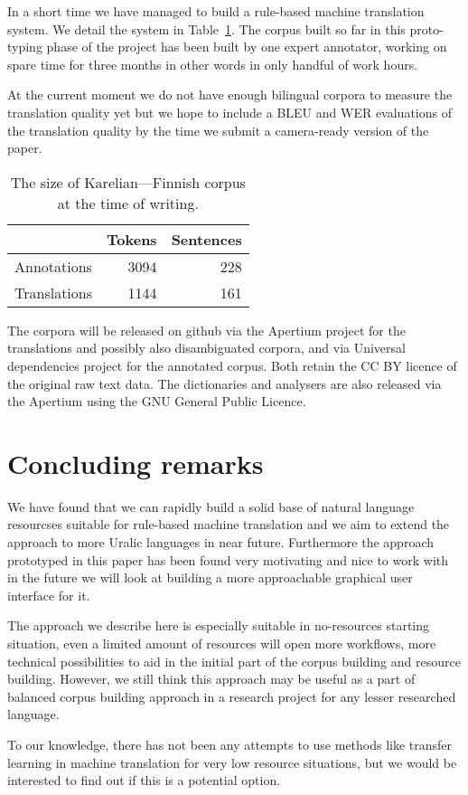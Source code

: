 \documentclass{flammie}
\begin{document}
In a short time we have managed to build a rule-based machine translation
system. We detail the system in Table~\ref{table:sizes}. The corpus built
so far in this proto-typing phase of the project has been built by one
expert annotator, working on spare time for three months in other words in
only handful of work hours.

At the current moment we do not have enough bilingual corpora to measure the
translation quality yet but we hope to include a BLEU and WER evaluations of
the translation quality by the time we submit a camera-ready version of the
paper.

\begin{table}
    \begin{tabular}{lrr}
        \toprule
         & Tokens & Sentences \\
        \midrule
        Annotations & 3094 & 228 \\
        Translations & 1144 & 161 \\
        \bottomrule
    \end{tabular}
    \caption{The size of Karelian---Finnish corpus at the time of
    writing.\label{table:sizes}}
\end{table}

The corpora will be released on github via the Apertium project for the
translations and possibly also disambiguated corpora, and via Universal
dependencies project for the annotated corpus. Both retain the CC BY
licence of the original raw text data. The dictionaries and analysers
are also released via the Apertium using the GNU General Public Licence.

\section{Concluding remarks}
\label{sec:conclusion}

We have found that we can rapidly build a solid base of natural language
resourcses suitable for rule-based machine translation and we aim to extend the
approach to more Uralic languages in near future. Furthermore the approach
prototyped in this paper has been found very motivating and nice to work with
in the future we will look at building a more approachable graphical user
interface for it.

The approach we describe here is especially suitable in no-resources starting
situation, even a limited amount of resources will open more workflows, more
technical possibilities to aid in the initial part of the corpus building and
resource building. However, we still think this approach may be useful as a
part of balanced corpus building approach in a research project for any lesser
researched language.

To our knowledge, there has not been any attempts to use methods like transfer
learning in machine translation for very low resource situations, but we
would be interested to find out if this is a potential option.



\end{document}
